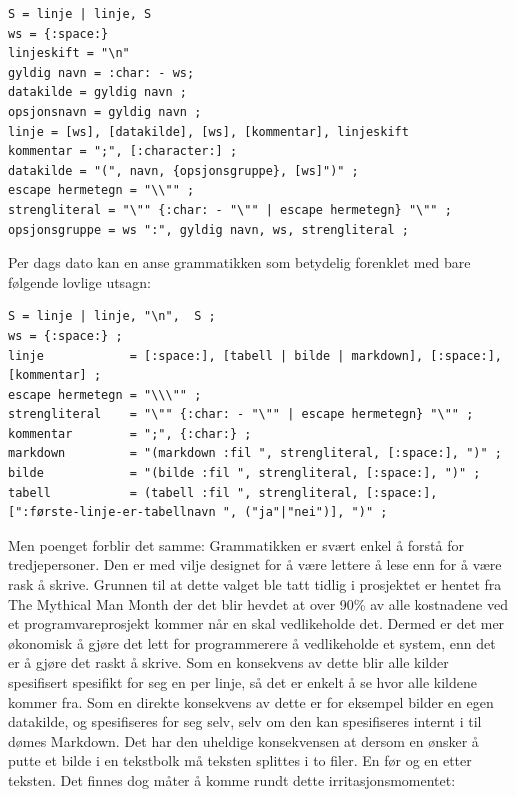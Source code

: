 \documentclass[norsk, 11pt, a4paper]{article}
\begin{document}
\lstset{language=Java}
\begin{lstlisting}
S = linje | linje, S
ws = {:space:}
linjeskift = "\n"
gyldig navn = :char: - ws;
datakilde = gyldig navn ;
opsjonsnavn = gyldig navn ;
linje = [ws], [datakilde], [ws], [kommentar], linjeskift
kommentar = ";", [:character:] ;
datakilde = "(", navn, {opsjonsgruppe}, [ws]")" ;
escape hermetegn = "\\"" ;
strengliteral = "\"" {:char: - "\"" | escape hermetegn} "\"" ;
opsjonsgruppe = ws ":", gyldig navn, ws, strengliteral ;
\end{lstlisting}




Per dags dato kan en anse grammatikken som betydelig forenklet med bare følgende lovlige utsagn:

\begin{lstlisting}
S = linje | linje, "\n",  S ;
ws = {:space:} ;
linje            = [:space:], [tabell | bilde | markdown], [:space:], [kommentar] ;
escape hermetegn = "\\\"" ;
strengliteral    = "\"" {:char: - "\"" | escape hermetegn} "\"" ;
kommentar        = ";", {:char:} ;
markdown         = "(markdown :fil ", strengliteral, [:space:], ")" ;
bilde            = "(bilde :fil ", strengliteral, [:space:], ")" ;
tabell           = (tabell :fil ", strengliteral, [:space:], [":første-linje-er-tabellnavn ", ("ja"|"nei")], ")" ;
\end{lstlisting}

Men poenget forblir det samme: Grammatikken er svært enkel å forstå for tredjepersoner. Den er med vilje designet for å være lettere å lese enn for å være rask å skrive. 
Grunnen til at dette valget ble tatt tidlig i prosjektet er hentet fra The Mythical Man Month\cite{MythicalManMonth} der det blir hevdet at over 90\% av alle kostnadene ved et programvareprosjekt kommer når en skal vedlikeholde det. Dermed er det mer økonomisk å gjøre det lett for programmerere å vedlikeholde et system, enn det er å gjøre det raskt å skrive. Som en konsekvens av dette blir alle kilder spesifisert spesifikt for seg en per linje, så det er enkelt å se hvor alle kildene kommer fra. Som en direkte konsekvens av dette er for eksempel bilder en egen datakilde, og spesifiseres for seg selv, selv om den kan spesifiseres internt i til dømes Markdown. Det har den uheldige konsekvensen at dersom en ønsker å putte et bilde i en tekstbolk må teksten splittes i to filer. En før og en etter teksten. Det finnes dog måter å komme rundt dette irritasjonsmomentet:
\end{document}
